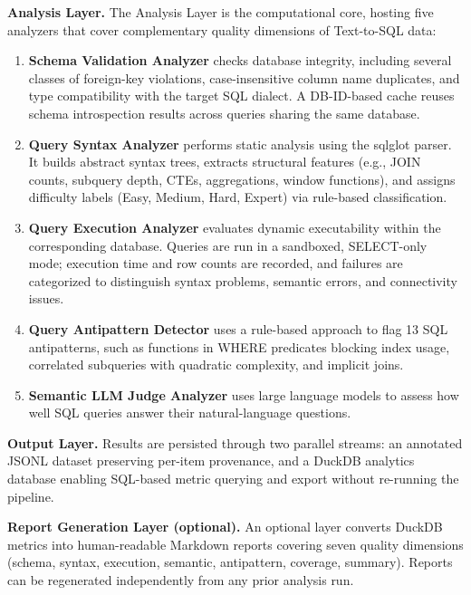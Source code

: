 \documentclass[print]{einformatica}
\begin{document}
\textbf{Analysis Layer.} The Analysis Layer is the computational core, hosting five analyzers that cover complementary quality dimensions of Text-to-SQL data:

\begin{enumerate}[nosep]
\item \textbf{Schema Validation Analyzer} checks database integrity, including several classes of foreign-key violations, case-insensitive column name duplicates, and type compatibility with the target SQL dialect. A DB-ID-based cache reuses schema introspection results across queries sharing the same database.

\item \textbf{Query Syntax Analyzer} performs static analysis using the sqlglot parser. It builds abstract syntax trees, extracts structural features (e.g., JOIN counts, subquery depth, CTEs, aggregations, window functions), and assigns difficulty labels (Easy, Medium, Hard, Expert) via rule-based classification.

\item \textbf{Query Execution Analyzer} evaluates dynamic executability within the corresponding database. Queries are run in a sandboxed, SELECT-only mode; execution time and row counts are recorded, and failures are categorized to distinguish syntax problems, semantic errors, and connectivity issues.

\item \textbf{Query Antipattern Detector} uses a rule-based approach to flag 13 SQL antipatterns, such as functions in WHERE predicates blocking index usage, correlated subqueries with quadratic complexity, and implicit joins.

\item \textbf{Semantic LLM Judge Analyzer} uses large language models to assess how well SQL queries answer their natural-language questions. 
\end{enumerate}

\textbf{Output Layer.} Results are persisted through two parallel streams: an annotated JSONL dataset preserving per-item provenance, and a DuckDB analytics database enabling SQL-based metric querying and export without re-running the pipeline.

\textbf{Report Generation Layer (optional).} An optional layer converts DuckDB metrics into human-readable Markdown reports covering seven quality dimensions (schema, syntax, execution, semantic, antipattern, coverage, summary). Reports can be regenerated independently from any prior analysis run.
\end{document}

